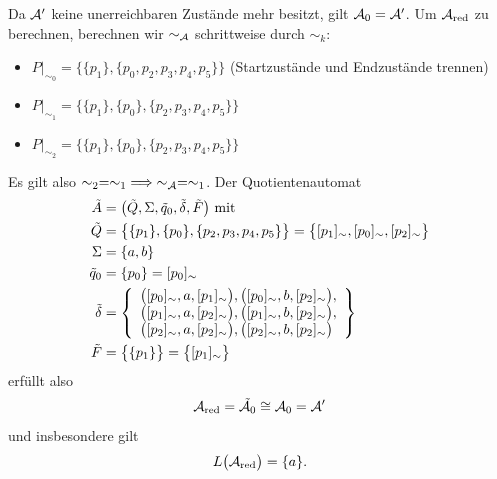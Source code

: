 Da $\A'$ keine unerreichbaren Zustände mehr besitzt, gilt $\A_0=\A'$.
Um $\A_{\text{red}}$ zu berechnen, berechnen wir $\sim_{\A}$ schrittweise durch $\sim_k$:
\begin{itemize}
	\item $P|_{\sim_0}=\big\lbrace\lbrace p_1\rbrace,\lbrace p_0,p_2,p_3,p_4,p_5\rbrace\big\rbrace$ (Startzustände und Endzustände trennen)
	\item $P|_{\sim_1}=\big\lbrace\lbrace p_1\rbrace,\lbrace p_0\rbrace,\lbrace p_2,p_3,p_4,p_5\rbrace\big\rbrace$
	\item $P|_{\sim_2}=\big\lbrace\lbrace p_1\rbrace,\lbrace p_0\rbrace,\lbrace p_2,p_3,p_4,p_5\rbrace\big\rbrace$
\end{itemize}
Es gilt also $\sim_2=\sim_1\implies\sim_\A=\sim_1$. 
Der Quotientenautomat
\begin{align*}
	\tilde{A}&=\big(\tilde{Q},\Sigma,\tilde{q}_0,\tilde{\delta},\tilde{F}\big)\mit\\
	\tilde{Q}&=\big\lbrace\lbrace p_1\rbrace,\lbrace p_0\rbrace,\lbrace p_2,p_3,p_4,p_5\rbrace\big\rbrace
	=
	\big\lbrace [p_1]_{\sim},[p_0]_\sim,[p_2]_\sim\big\rbrace\\
	\Sigma&=\lbrace a,b\rbrace\\
	\tilde{q}_0&=\lbrace p_0\rbrace=[p_0]_\sim\\
	\tilde{\delta}&=\left\lbrace
		\begin{array}{l}
			\big([p_0]_{\sim},a,[p_1]_{\sim}\big), \big([p_0]_{\sim},b,[p_2]_{\sim}\big),\\
			\big([p_1]_{\sim},a,[p_2]_{\sim}\big), \big([p_1]_{\sim},b,[p_2]_{\sim}\big),\\
			\big([p_2]_{\sim},a,[p_2]_{\sim}\big), \big([p_2]_{\sim},b,[p_2]_{\sim}\big)
		\end{array}
	\right\rbrace\\
	\tilde{F}&=\big\lbrace \lbrace p_1\rbrace\big\rbrace=\big\lbrace [p_1]_\sim\big\rbrace
\end{align*}
erfüllt also
\begin{align*}
	\A_{\text{red}}=\tilde{\A_0}\cong\A_0=\A'
\end{align*}
und insbesondere gilt
\begin{align*}
	L\big(\A_\red\big)=\lbrace a\rbrace.
\end{align*}


